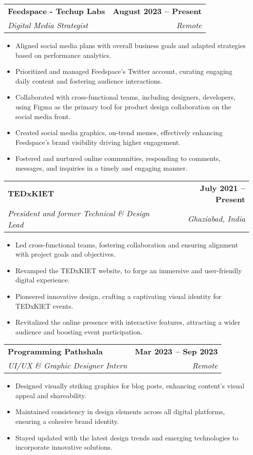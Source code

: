 \documentclass[a4paper,20pt]{article}
\makeatletter
\newcommand{\resumeItem}[1]{
  \item\small{
    {#1 \vspace{-2pt}}
  }
}
\newcommand{\resumeSubheading}[4]{
  \vspace{-2pt}\item
    \begin{tabular*}{1.0\textwidth}[t]{l@{\extracolsep{\fill}}r}
      \textbf{#1} & \textbf{\small #2} \\
      \textit{\small#3} & \textit{\small #4} \\
    \end{tabular*}\vspace{-7pt}
}
\newcommand{\resumeItemListStart}{\begin{itemize}}
\newcommand{\resumeItemListEnd}{\end{itemize}\vspace{-5pt}}
\makeatother
\begin{document}
    \resumeSubheading
      {Feedspace - Techup Labs}{August 2023 -- Present}
      {Digital Media Strategist}{Remote}
      \resumeItemListStart
      \resumeItem{Aligned social media plans with overall business goals and adapted strategies based on performance analytics.}
        \resumeItem{Prioritized and managed Feedspace's Twitter account, curating engaging daily content and fostering audience interactions.}
        \resumeItem{Collaborated with cross-functional teams, including designers, developers, using Figma as the primary tool for product design collaboration on the social media front.}
        \resumeItem{Created social media graphics, on-trend memes, effectively enhancing Feedspace's brand visibility driving higher engagement.}
        \resumeItem{Fostered and nurtured online communities, responding to comments, messages, and inquiries in a timely and engaging manner.}
        
    \resumeItemListEnd
\vspace{-10pt}
    \resumeSubheading
      {TEDxKIET}{July 2021 -- Present}
      {President and former Technical \& Design Lead}{Ghaziabad, India}
      \resumeItemListStart
      \resumeItem{Led cross-functional teams, fostering collaboration and ensuring alignment with project goals and objectives.}
        \resumeItem{Revamped the TEDxKIET website, to forge an immersive and user-friendly digital experience.}
        \resumeItem{Pioneered innovative design, crafting a captivating visual identity for TEDxKlET events.}
        \resumeItem{Revitalized the online presence with interactive features, attracting a wider audience and boosting event participation.}
    \resumeItemListEnd
    
    \resumeSubheading
      {Programming Pathshala}{Mar 2023 -- Sep 2023}
      {UI/UX \& Graphic Designer Intern}{Remote}
      \resumeItemListStart
        \resumeItem{ Designed visually striking graphics for blog posts, enhancing content's visual appeal and shareability.}
        \resumeItem{Maintained consistency in design elements across all digital platforms, ensuring a cohesive brand identity.}
        \resumeItem{Stayed updated with the latest design trends and emerging technologies to incorporate innovative solutions.}
    \resumeItemListEnd
    
    
    
\end{document}
